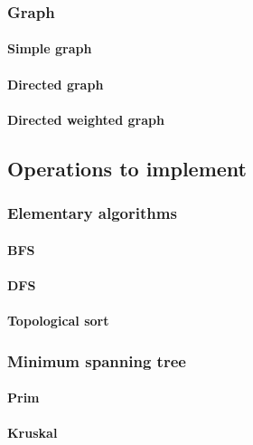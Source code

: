 \subsubsection{Graph}
\paragraph{Simple graph}

\paragraph{Directed graph}

\paragraph{Directed weighted graph}


\subsection{Operations to implement}

\subsubsection{Elementary algorithms}

\paragraph{BFS}

\paragraph{DFS}

\paragraph{Topological sort}

\subsubsection{Minimum spanning tree}

\paragraph{Prim}

\paragraph{Kruskal}


